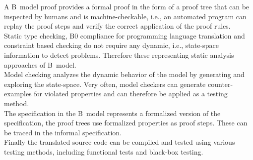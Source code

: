 \begin{table}[h!]
\begin{center}
\end{center}
\caption{Correspondence between CENELEC norm recommendations and the presented verification processes}
\label{tab:cenelec}
\end{table}

A B~model proof provides a formal proof in the form of a proof tree that can be
inspected by humans and is machine-checkable, i.e., an automated program can
replay the proof steps and verify the correct application of the proof rules.\\
Static type checking, B0 compliance for programming language translation and
constraint based checking do not require any dynamic, i.e., state-space
information to detect problems. Therefore these representing static analysis
approaches of B~model.\\
Model checking analyzes the dynamic behavior of the model by generating and
exploring the state-space. Very often, model checkers can generate
counter-examples for violated properties and can therefore be applied as a
testing method.\\
The specification in the B~model represents a formalized version of the
specification, the proof trees use formalized properties as proof steps. These
can be traced in the informal specification.\\
Finally the translated source code can be compiled and tested using various
testing methods, including functional tests and black-box testing.

